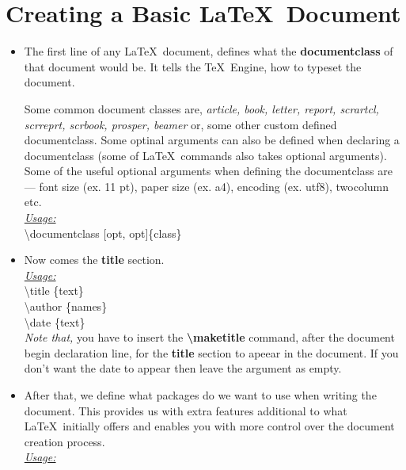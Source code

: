 \documentclass[12pt, twocolumn]{article}
\begin{document}
 \section{Creating a Basic \LaTeX\ Document}
\begin{itemize}
 \item The first line of any \LaTeX\ document, defines what the \textbf{ documentclass} of that document would be. It tells the \TeX\ Engine, how to typeset the document.
 
 Some common document classes are, \textit{article, book, letter, report, scrartcl, scrreprt, scrbook, prosper, beamer} or, some other custom defined documentclass. Some optinal arguments can also be defined when declaring a documentclass (some of \LaTeX\ commands also takes optional arguments). Some of the useful optional arguments when defining the documentclass are --- font size (ex. 11 pt), paper size (ex. a4), encoding (ex. utf8), twocolumn etc. \\
 
 \underline{\textit{Usage:}} \\
 
 \textbackslash documentclass [opt, opt]\{class\} \\ 
 
 \pagebreak

 \item  Now comes the \textbf{title} section. \\
 
 \underline{\textit{Usage:}} \\
 
 \textbackslash title \{text\} \\
 \textbackslash author \{names\} \\
 \textbackslash date \{text\} \\
 
 \emph{Note that,} you have to insert the \textbf{\textbackslash maketitle} command, after the document begin declaration line, for the \textbf{title} section to apeear in the document. If you don't want the date to appear then leave the argument as empty.

 \item After that, we define what packages do we want to use when writing the document. This provides us with extra features additional to what \LaTeX\ initially offers and enables you with more control over the document creation process. \\
 
 \underline{\textit{Usage:}} \\
 

\end{itemize}
\end{document}
